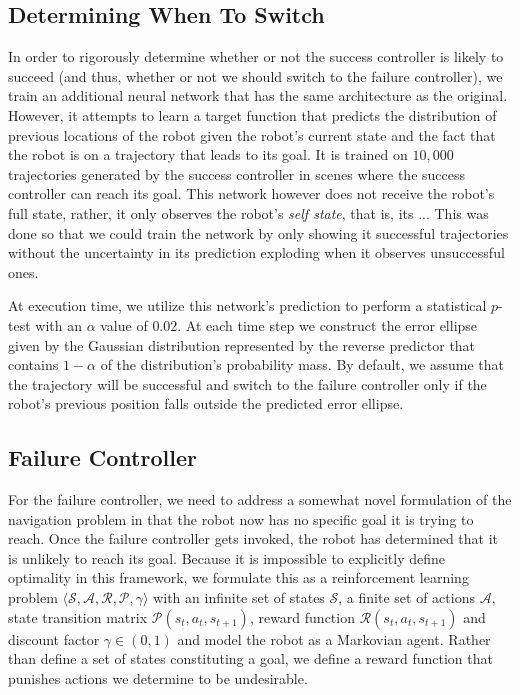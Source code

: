 \documentclass[letterpaper, 10 pt, conference]{ieeeconf}  %
\begin{document}
	\subsection{Determining When To Switch}
		In order to rigorously determine whether or not the success controller is likely to succeed (and thus, whether or not we should switch to the failure controller), we train an additional neural network that has the same architecture as the original. However, it attempts to learn a target function that predicts the distribution of previous locations of the robot given the robot's current state and the fact that the robot is on a trajectory that leads to its goal. It is trained on $10,000$ trajectories generated by the success controller in scenes where the success controller can reach its goal. This network however does not receive the robot's full state, rather, it only observes the robot's \textit{self state}, that is, its ... This was done so that we could train the network by only showing it successful trajectories without the uncertainty in its prediction exploding when it observes unsuccessful ones. 
		
		At execution time, we utilize this network's prediction to perform a statistical $p$-test with an $\alpha$ value of $0.02$. At each time step we construct the error ellipse given by the Gaussian distribution represented by the reverse predictor that contains $1-\alpha$ of the distribution's probability mass. By default, we assume that the trajectory will be successful and switch to the failure controller only if the robot's previous position falls outside the predicted error ellipse.
	
	\subsection{Failure Controller}
		For the failure controller, we need to address a somewhat novel formulation of the navigation problem in that the robot now has no specific goal it is trying to reach. Once the failure controller gets invoked, the robot has determined that it is unlikely to reach its goal. Because it is impossible to explicitly define optimality in this framework, we formulate this as a reinforcement learning problem $\langle\mathcal{S}, \mathcal{A}, \mathcal{R}, \mathcal{P}, \gamma\rangle$ with an infinite set of states $\mathcal{S}$, a finite set of actions $\mathcal{A}$, state transition matrix $\mathcal{P}(s_t, a_t, s_{t+1})$, reward function $\mathcal{R}(s_t, a_t, s_{t+1})$ and discount factor $\gamma \in (0, 1)$ \cite{suttonandbarto} and model the robot as a Markovian agent. Rather than define a set of states constituting a goal, we define a reward function that punishes actions we determine to be undesirable. 
		
\end{document}
